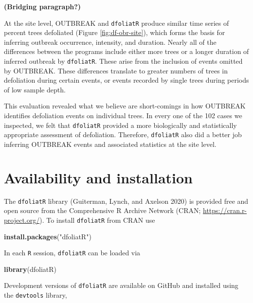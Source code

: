 \documentclass[review]{elsarticle} %
\newenvironment{Shaded}{\begin{snugshade}}{\end{snugshade}}
\newcommand{\KeywordTok}[1]{\textcolor[rgb]{0.13,0.29,0.53}{\textbf{#1}}}
\newcommand{\NormalTok}[1]{#1}
\newcommand{\StringTok}[1]{\textcolor[rgb]{0.31,0.60,0.02}{#1}}
\begin{document}
\textbf{(Bridging paragraph?)}

At the site level, OUTBREAK and \texttt{dfoliatR} produce similar time series of percent trees defoliated (Figure \ref{fig:df-obr-site}), which forms the basis for inferring outbreak occurrence, intensity, and duration. Nearly all of the differences between the programs include either more trees or a longer duration of inferred outbreak by \texttt{dfoliatR}. These arise from the inclusion of events omitted by OUTBREAK. These differences translate to greater numbers of trees in defoliation during certain events, or events recorded by single trees during periods of low sample depth.

This evaluation revealed what we believe are short-comings in how OUTBREAK identifies defoliation events on individual trees. In every one of the 102 cases we inspected, we felt that \texttt{dfoliatR} provided a more biologically and statistically appropriate assessment of defoliation. Therefore, \texttt{dfoliatR} also did a better job inferring OUTBREAK events and associated statistics at the site level.

\hypertarget{availability-and-installation}{%
\section{Availability and installation}\label{availability-and-installation}}

The \texttt{dfoliatR} library (Guiterman, Lynch, and Axelson 2020) is provided free and open source from the Comprehensive R Archive Network (CRAN; \url{https://cran.r-project.org/}). To install \texttt{dfoliatR} from CRAN use

\begin{Shaded}
\begin{Highlighting}[]
\KeywordTok{install.packages}\NormalTok{(}\StringTok{"dfoliatR"}\NormalTok{)}
\end{Highlighting}
\end{Shaded}

In each \texttt{R} session, \texttt{dfoliatR} can be loaded via

\begin{Shaded}
\begin{Highlighting}[]
\KeywordTok{library}\NormalTok{(dfoliatR)}
\end{Highlighting}
\end{Shaded}

Development versions of \texttt{dfoliatR} are available on GitHub and installed using the \texttt{devtools} library,
\end{document}
